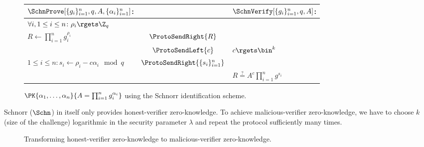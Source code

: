 \begin{figure*}
  \centering
  \begin{tabular}{lcl}
    \(\SchnProve[\{g_i\}_{i=1}^n, q, A, \{\alpha_i\}_{i=1}^n]\):
    &
    & \(\SchnVerify[\{g_i\}_{i=1}^n, q, A]\):
    \\
    \toprule

    \(\forall i, 1\leq i\leq n\colon \rho_i\rgets \Z_q\)
    &
    &
    \\

    \(R\gets \prod_{i=1}^n g_i^{\rho_i}\)
    & \(\ProtoSendRight{R}\)
    &
    \\

    & \(\ProtoSendLeft{c}\)
    & \(c\rgets \bin^k\)
    \\

    \(1\leq i\leq n\colon s_i\gets \rho_i - c\alpha_i \mod q\)
    & \(\ProtoSendRight{\{s_i\}_{i=1}^n}\)
    &
    \\

    &
    & \(R \stackrel{?}{=} A^c \prod_{i=1}^n g^{s_i}\)
    \\
    
    \bottomrule
  \end{tabular}
  \caption{%
    \(\PK{\alpha_1, \dotsc, \alpha_n}{A = \prod_{i=1}^n g_i^{\alpha_i}}\) using 
    the Schnorr identification scheme.
  }%
  \label{PKalgorithms}
\end{figure*}


Schnorr (\(\Schn\)) in itself only provides honest-verifier zero-knowledge.
To achieve malicious-verifier zero-knowledge, we have to choose \(k\) (size of 
the challenge) logarithmic in the security parameter \(\lambda\) and repeat the 
protocol sufficiently many times.


\begin{figure*}
  \begin{minipage}{0.49\linewidth}
    \begin{algorithmic}
        \EndFor{}
      \EndFunction{}
    \end{algorithmic}
  \end{minipage}
  \begin{minipage}{0.49\linewidth}
    \begin{algorithmic}
        \EndFor{}
      \EndFunction{}
    \end{algorithmic}
  \end{minipage}
  \caption{%
    Transforming honest-verifier zero-knowledge to malicious-verifier 
    zero-knowledge.
  }%
  \label{ZKPKalgorithms}
\end{figure*}

